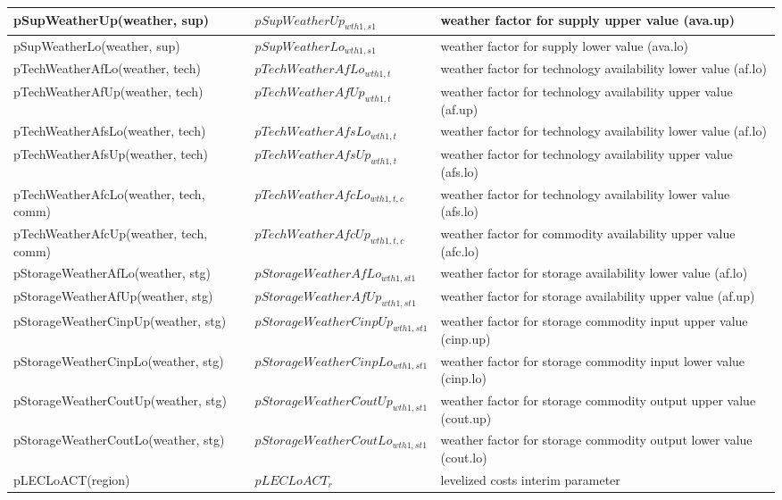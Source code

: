 \documentclass{article}
\begin{document}
\begin{longtable}{|p{10cm}|p{5cm}|p{9cm}|}
 \hline
pSupWeatherUp(weather, sup) & $pSupWeatherUp_{wth1,s1}$ & weather factor for supply upper value (ava.up) \\ 
 \hline
pSupWeatherLo(weather, sup) & $pSupWeatherLo_{wth1,s1}$ & weather factor for supply lower value (ava.lo) \\ 
 \hline
pTechWeatherAfLo(weather, tech) & $pTechWeatherAfLo_{wth1,t}$ & weather factor for technology availability lower value (af.lo) \\ 
 \hline
pTechWeatherAfUp(weather, tech) & $pTechWeatherAfUp_{wth1,t}$ & weather factor for technology availability upper value (af.up) \\ 
 \hline
pTechWeatherAfsLo(weather, tech) & $pTechWeatherAfsLo_{wth1,t}$ & weather factor for technology availability lower value (af.lo) \\ 
 \hline
pTechWeatherAfsUp(weather, tech) & $pTechWeatherAfsUp_{wth1,t}$ & weather factor for technology availability upper value (afs.lo) \\ 
 \hline
pTechWeatherAfcLo(weather, tech, comm) & $pTechWeatherAfcLo_{wth1,t,c}$ & weather factor for technology availability lower value (afs.lo) \\ 
 \hline
pTechWeatherAfcUp(weather, tech, comm) & $pTechWeatherAfcUp_{wth1,t,c}$ & weather factor for commodity availability upper value (afc.lo) \\ 
 \hline
pStorageWeatherAfLo(weather, stg) & $pStorageWeatherAfLo_{wth1,st1}$ & weather factor for storage availability lower value (af.lo) \\ 
 \hline
pStorageWeatherAfUp(weather, stg) & $pStorageWeatherAfUp_{wth1,st1}$ & weather factor for storage availability upper value (af.up) \\ 
 \hline
pStorageWeatherCinpUp(weather, stg) & $pStorageWeatherCinpUp_{wth1,st1}$ & weather factor for storage commodity input upper value (cinp.up) \\ 
 \hline
pStorageWeatherCinpLo(weather, stg) & $pStorageWeatherCinpLo_{wth1,st1}$ & weather factor for storage commodity input lower value (cinp.lo) \\ 
 \hline
pStorageWeatherCoutUp(weather, stg) & $pStorageWeatherCoutUp_{wth1,st1}$ & weather factor for storage commodity output upper value (cout.up) \\ 
 \hline
pStorageWeatherCoutLo(weather, stg) & $pStorageWeatherCoutLo_{wth1,st1}$ & weather factor for storage commodity output lower value (cout.lo) \\ 
 \hline
pLECLoACT(region) & $pLECLoACT_{r}$ & levelized costs interim parameter \\ 
 \hline
\end{longtable}
\end{document}
